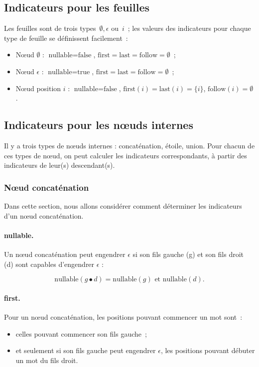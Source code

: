 \subsection{Indicateurs pour les feuilles}
Les feuilles sont de trois types~$\emptyset, \epsilon$ ou~$i$~; les valeurs des indicateurs pour chaque type de feuille se d{\'e}finissent facilement~: 
\begin{itemize}
\item N\oe{}ud $\emptyset$ : $\mbox{nullable}=\mbox{false}$, $\mbox{first}=\mbox{last}=\mbox{follow}=\emptyset$~;
\item N\oe{}ud $\epsilon$ : $\mbox{nullable}=\mbox{true}$, $\mbox{first}=\mbox{last}=\mbox{follow}=\emptyset$~;
\item N\oe{}ud position $i$ : $\mbox{nullable}=\mbox{false}$, $\mbox{first}(i)=\mbox{last}(i)=\{i\}$, $\mbox{follow}(i)=\emptyset$.
\end{itemize}
\subsection{Indicateurs pour les n\oe{}uds internes}
Il y a trois types de n\oe{}uds internes : concat{\'e}nation, {\'e}toile, union. Pour chacun de ces types de n\oe{}ud, on peut calculer les indicateurs correspondants, {\`a} partir des indicateurs de leur(s) descendant(s). 

\subsubsection{N\oe{}ud concat\'enation}
Dans cette section, nous allons consid\'erer comment d\'eterminer les indicateurs d'un n\oe{}ud concat\'enation.
\paragraph{nullable.}
Un n\oe{}ud concat{\'e}nation peut engendrer $\epsilon$ si son fils gauche (g) et son fils droit (d) sont capables d'engendrer $\epsilon$ :

$$\mbox{nullable}(g \bullet d)=\mbox{nullable}(g) \mbox{ et } \mbox{nullable}(d).$$
\paragraph{first.}
Pour un n\oe{}ud concat{\'e}nation, les positions pouvant commencer un mot sont~:
\begin{itemize}
\item  celles pouvant commencer son fils gauche~;
\item et seulement si son fils gauche peut engendrer $\epsilon$, les positions pouvant d{\'e}buter un mot du fils droit.
\end{itemize}

